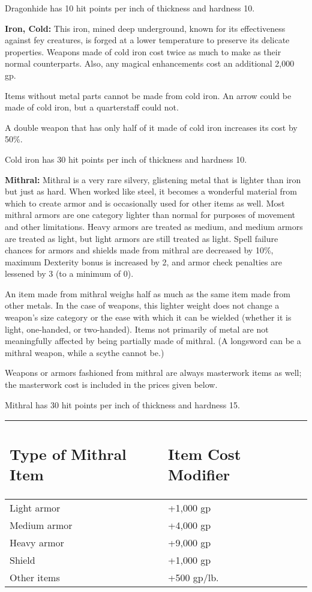 \documentclass{article}
\begin{document}
Dragonhide has 10 hit points per inch of thickness and hardness 10.

\vspace{12pt}
\textbf{Iron, Cold:} This iron, mined deep underground, known for its effectiveness 
against fey creatures, is forged at a lower temperature to preserve its delicate 
properties. Weapons made of cold iron cost twice as much to make as their normal 
counterparts. Also, any magical enhancements cost an additional 2,000 gp. 

Items without metal parts cannot be made from cold iron. An arrow could be made 
of cold iron, but a quarterstaff could not.

A double weapon that has only half of it made of cold iron increases its cost by 
50\%.

Cold iron has 30 hit points per inch of thickness and hardness 10.

\vspace{12pt}
\textbf{Mithral:} Mithral is a very rare silvery, glistening metal that is lighter 
than iron but just as hard. When worked like steel, it becomes a wonderful material 
from which to create armor and is occasionally used for other items as well. Most 
mithral armors are one category lighter than normal for purposes of movement and 
other limitations. Heavy armors are treated as medium, and medium armors are treated 
as light, but light armors are still treated as light. Spell failure chances for 
armors and shields made from mithral are decreased by 10\%, maximum Dexterity bonus 
is increased by 2, and armor check penalties are lessened by 3 (to a minimum of 
0).

An item made from mithral weighs half as much as the same item made from other 
metals. In the case of weapons, this lighter weight does not change a weapon's 
size category or the ease with which it can be wielded (whether it is light, one-handed, 
or two-handed). Items not primarily of metal are not meaningfully affected by being 
partially made of mithral. (A longsword can be a mithral weapon, while a scythe 
cannot be.)

Weapons or armors fashioned from mithral are always masterwork items as well; the 
masterwork cost is included in the prices given below.

Mithral has 30 hit points per inch of thickness and hardness 15.

\begin{tabular}{|>{\raggedright}p{94pt}|>{\raggedright}p{86pt}|}
\hline
\subsection*{T\textbf{ype of Mithral Item}} & \subsection*{I\textbf{tem Cost Modifier}}\tabularnewline
\hline
Light armor & +1,000 gp\tabularnewline
\hline
Medium armor & +4,000 gp\tabularnewline
\hline
Heavy armor & +9,000 gp\tabularnewline
\hline
Shield & +1,000 gp\tabularnewline
\hline
Other items & +500 gp/lb.\tabularnewline
\hline
\end{tabular}
\end{document}
